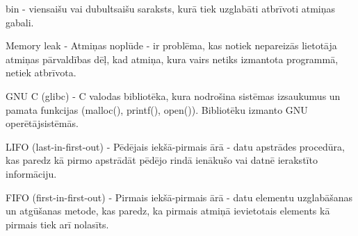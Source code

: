 bin - viensaišu vai dubultsaišu saraksts, kurā tiek uzglabāti atbrīvoti atmiņas gabali.

Memory leak - Atmiņas noplūde - ir problēma, kas notiek nepareizās lietotāja atmiņas pārvaldības dēļ, kad atmiņa, kura vairs netiks izmantota programmā, netiek atbrīvota.

GNU C (glibc) - C valodas bibliotēka, kura nodrošina sistēmas izsaukumus un pamata funkcijas (malloc(), printf(), open()). Bibliotēku izmanto GNU operētājsistēmās.

LIFO (last-in-first-out) - Pēdējais iekšā-pirmais ārā - datu apstrādes procedūra, kas paredz kā pirmo apstrādāt pēdējo rindā ienākušo vai datnē ierakstīto informāciju.

FIFO (first-in-first-out) - Pirmais iekšā-pirmais ārā - datu elementu uzglabāšanas un atgūšanas metode, kas paredz, ka pirmais atmiņā ievietotais elements kā pirmais tiek arī nolasīts.